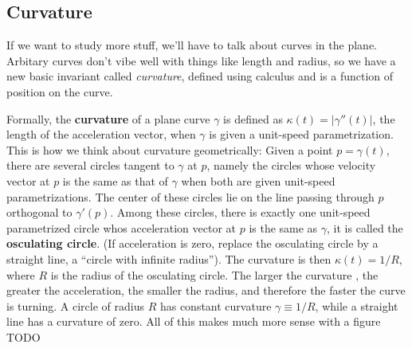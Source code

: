 \subsection{Curvature}

If we want to study more stuff, we'll have to talk about curves in the plane. Arbitary curves don't vibe well with things like length and radius, so we have a new basic invariant called \emph{curvature}, defined using calculus and is a function of position on the curve.

Formally, the \textbf{curvature} of a plane curve $\gamma$ is defined as $\kappa(t)= | \gamma ''(t)|$, the length of the acceleration vector, when $\gamma$ is given a unit-speed parametrization. This is how we think about curvature geometrically: Given a point $p=\gamma(t)$, there are several circles tangent to $\gamma$ at $p$, namely the circles whose velocity vector at $p$ is the same as that of $\gamma$ when both are given unit-speed parametrizations. The center of these circles lie on the line passing through $p$ orthogonal to $\gamma'(p)$. Among these circles, there is exactly one unit-speed parametrized circle whos acceleration vector at $p$ is the same as $\gamma$, it is called the \textbf{osculating circle}. (If acceleration is zero, replace the osculating circle by a straight line, a ``circle with infinite radius''). The curvature is then $\kappa(t)=1 /R$, where $R$ is the radius of the osculating circle. The larger the curvature , the greater the acceleration, the smaller the radius, and therefore the faster the curve is turning. A circle of radius $R$ has constant curvature $\gamma \equiv 1 /R$, while a straight line has a curvature of zero. All of this makes much more sense with a figure {\color{red}TODO}

